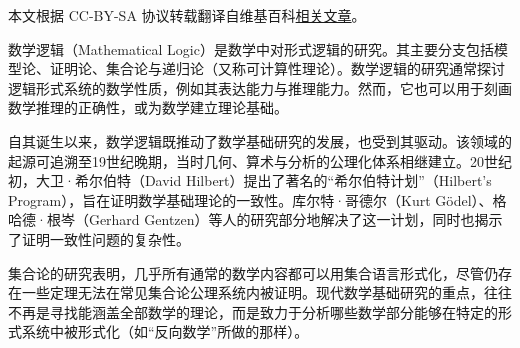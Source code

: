 
本文根据 CC-BY-SA 协议转载翻译自维基百科\href{https://en.wikipedia.org/wiki/Mathematical_logic}{相关文章}。

数学逻辑（Mathematical Logic）是数学中对形式逻辑的研究。其主要分支包括模型论、证明论、集合论与递归论（又称可计算性理论）。数学逻辑的研究通常探讨逻辑形式系统的数学性质，例如其表达能力与推理能力。然而，它也可以用于刻画数学推理的正确性，或为数学建立理论基础。

自其诞生以来，数学逻辑既推动了数学基础研究的发展，也受到其驱动。该领域的起源可追溯至19世纪晚期，当时几何、算术与分析的公理化体系相继建立。20世纪初，大卫·希尔伯特（David Hilbert）提出了著名的“希尔伯特计划”（Hilbert’s Program），旨在证明数学基础理论的一致性。库尔特·哥德尔（Kurt Gödel）、格哈德·根岑（Gerhard Gentzen）等人的研究部分地解决了这一计划，同时也揭示了证明一致性问题的复杂性。

集合论的研究表明，几乎所有通常的数学内容都可以用集合语言形式化，尽管仍存在一些定理无法在常见集合论公理系统内被证明。现代数学基础研究的重点，往往不再是寻找能涵盖全部数学的理论，而是致力于分析哪些数学部分能够在特定的形式系统中被形式化（如“反向数学”所做的那样）。
